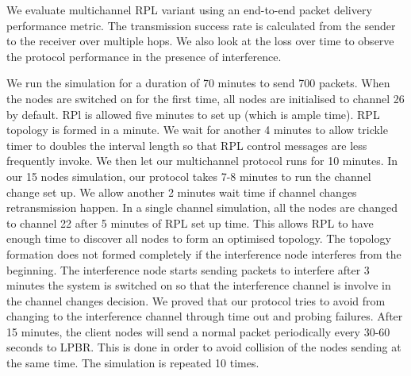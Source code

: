 



We evaluate multichannel RPL variant using an end-to-end packet delivery performance metric. The transmission success rate is calculated from the sender to the receiver over multiple hops. We also look at the loss over time to observe the protocol performance in the presence of interference.


We run the simulation for a duration of 70 minutes to send 700 packets. When the nodes are switched on for the first time, all nodes are initialised to channel 26 by default. RPl is allowed five minutes to set up (which is ample time). RPL topology is formed in a minute. We wait for another 4 minutes to allow trickle timer to doubles the interval length so that RPL control messages are less frequently invoke. We then let our multichannel protocol runs for 10 minutes. In our 15 nodes simulation, our protocol takes 7-8 minutes to run the channel change set up. We allow another 2 minutes wait time if channel changes retransmission happen. In a single channel simulation, all the nodes are changed to channel 22 after 5 minutes of RPL set up time. This allows RPL to have enough time to discover all nodes to form an optimised topology. The topology formation does not formed completely if the interference node interferes from the beginning. The interference node starts sending packets to interfere after 3 minutes the system is switched on so that the interference channel is involve in the channel changes decision. We proved that our protocol tries to avoid from changing to the interference channel through time out and probing failures. After 15 minutes, the client nodes will send a normal packet periodically every 30-60 seconds to LPBR. This is done in order to avoid collision of the nodes sending at the same time. The simulation is repeated 10 times.



